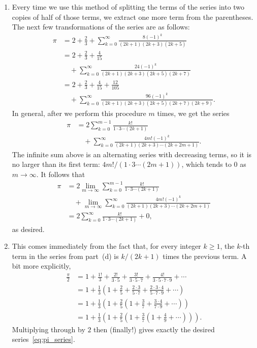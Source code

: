 \begin{multicols}{2}
\begin{itemize}[leftmargin=0em]
\begin{enumerate}[leftmargin=1.5em,label=\bf\color{ocre}(\alph*)]
			\item Every time we use this method of splitting the terms of the series into two copies of half of those terms, we extract one more term from the parentheses. The next few transformations of the series are as follows:
			\begin{align*}
				\pi & = 2 + \frac{2}{3} + \sum_{k=0}^\infty \frac{8(-1)^k}{(2k+1)(2k+3)(2k+5)} \\
				& = 2 + \frac{2}{3} + \frac{4}{15} \\
				& \quad + \sum_{k=0}^\infty \frac{24(-1)^k}{(2k+1)(2k+3)(2k+5)(2k+7)} \\
				& = 2 + \frac{2}{3} + \frac{4}{15} + \frac{12}{105} \\
				& \quad + \sum_{k=0}^\infty \frac{96(-1)^k}{(2k+1)(2k+3)(2k+5)(2k+7)(2k+9)}.
			\end{align*}
			In general, after we perform this procedure $m$ times, we get the series
			\begin{align*}
				\pi & = 2\sum_{k=0}^{m-1} \frac{k!}{1\cdot 3 \cdots (2k+1)} \\
				& \quad + \sum_{k=0}^\infty \frac{4m!(-1)^k}{(2k+1)(2k+3)\cdots(2k+2m+1)}.
			\end{align*}
			The infinite sum above is an alternating series with decreasing terms, so it is no larger than its first term: $4m!/(1\cdot 3 \cdots (2m+1))$, which tends to $0$ as $m\rightarrow\infty$. It follows that
			\begin{align*}
				\pi & = 2\lim_{m\rightarrow\infty} \sum_{k=0}^{m-1} \frac{k!}{1\cdot 3 \cdots (2k+1)} \\
				& \quad + \lim_{m\rightarrow\infty}\sum_{k=0}^\infty \frac{4m!(-1)^k}{(2k+1)(2k+3)\cdots(2k+2m+1)} \\
				& = 2\sum_{k=0}^\infty \frac{k!}{1\cdot 3 \cdots (2k+1)} + 0,
			\end{align*}
			as desired.
			
			\item This comes immediately from the fact that, for every integer $k \geq 1$, the $k$-th term in the series from part~(d) is $k/(2k+1)$ times the previous term. A bit more explicitly,
			\begin{align*}
				\frac{\pi}{2} & = 1 + \frac{1!}{3} + \frac{2!}{3\cdot 5} + \frac{3!}{3\cdot 5 \cdot 7} + \frac{4!}{3 \cdot 5 \cdot 7 \cdot 9} + \cdots \\
				& = 1 + \frac{1}{3}\left(1 + \frac{2}{5} + \frac{2\cdot 3}{5 \cdot 7} + \frac{2\cdot 3\cdot 4}{5 \cdot 7 \cdot 9} + \cdots\right) \\
				& = 1 + \frac{1}{3}\left(1 + \frac{2}{5}\left(1 + \frac{3}{7} + \frac{3\cdot 4}{7 \cdot 9} + \cdots\right)\right) \\
				& = 1 + \frac{1}{3}\left(1 + \frac{2}{5}\left(1 + \frac{3}{7}\left(1 + \frac{4}{9} + \cdots\right)\right)\right).
			\end{align*}
			Multiplying through by $2$ then (finally!) gives exactly the desired series~\eqref{eq:pi_series}.\\
		\end{enumerate}
	

\end{itemize}
\end{multicols}
